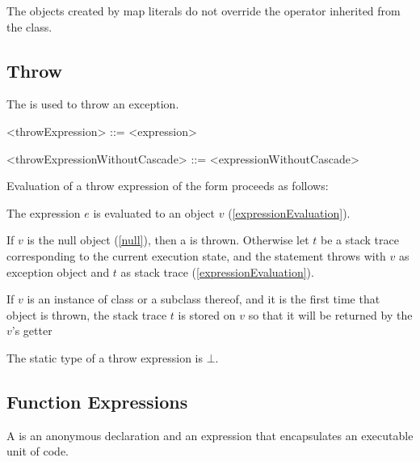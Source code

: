 \documentclass[makeidx]{article}
\begin{document}
{\LMHash{}%
The objects created by map literals do not override
the \lit{==} operator inherited from the  class.


\subsection{Throw}

\LMHash{}%
The  is used to throw an exception.

\begin{grammar}
<throwExpression> ::= \THROW{} <expression>

<throwExpressionWithoutCascade> ::= \THROW{} <expressionWithoutCascade>
\end{grammar}

\LMHash{}%
Evaluation of a throw expression of the form  proceeds as follows:

\LMHash{}%
The expression $e$ is evaluated to an object $v$
(\ref{expressionEvaluation}).


\LMHash{}%
If $v$ is the null object (\ref{null}), then a  is thrown.
Otherwise let $t$ be a stack trace corresponding to the current execution state,
and the \THROW{} statement throws with $v$ as exception object
and $t$ as stack trace (\ref{expressionEvaluation}).

\LMHash{}%
If $v$ is an instance of class  or a subclass thereof,
and it is the first time that  object is thrown,
the stack trace $t$ is stored on $v$ so that it will be returned
by the $v$'s  getter


\LMHash{}%
The static type of a throw expression is $\bot$.


\subsection{Function Expressions}

\LMHash{}%
A 
is an anonymous declaration and an expression
that encapsulates an executable unit of code.

}
\end{document}
